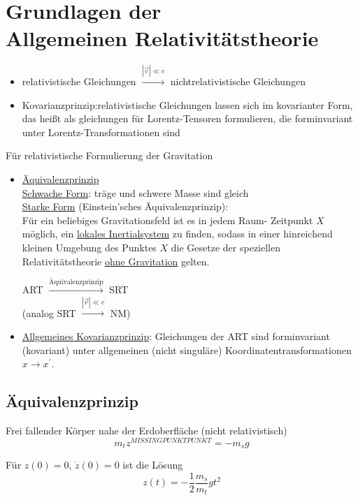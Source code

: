 \documentclass[a4paper, 11pt]{article}
\numberwithin{equation}{section}
\begin{document}
\newpage
\section{Grundlagen der \\Allgemeinen Relativitätstheorie}

\renewcommand{\labelitemi}{$\bullet$}
\begin{itemize}
\item relativistische Gleichungen $\xrightarrow{|\vec{v}| \ll c}$ nichtrelativistische Gleichungen

\item Kovarianzprinzip:relativistische Gleichungen lassen sich im kovarianter Form, das heißt als gleichungen für Lorentz-Tensoren formulieren, die forminvariant unter Lorentz-Transformationen sind
\end{itemize}

Für relativistische Formulierung der Gravitation
\begin{itemize}
\item \underline{Äquivalenzprinzip}\\
\underline{Schwache Form}: träge und schwere Masse sind gleich\\
\underline{Starke Form} (Einstein'sches Äquivalenzprinzip):\\
Für ein beliebiges Gravitationsfeld ist es in jedem Raum- Zeitpunkt $X$ möglich, ein \underline{lokales Inertialsystem} zu finden, sodass in einer hinreichend kleinen Umgebung des Punktes $X$ die Gesetze der speziellen Relativitätstheorie \underline{ohne Gravitation} gelten.

ART $\xrightarrow{\text{Äquivalenzprinzip}}$ SRT\\
(analog SRT $\xrightarrow{|\vec{v}| \ll c}$ NM)
\item \underline{Allgemeines Kovarianzprinzip}: Gleichungen der ART sind forminvariant (kovariant) unter allgemeinen (nicht singuläre) Koordinatentransformationen $x \rightarrow x^\prime$.
\end{itemize}

\subsection*{Äquivalenzprinzip}
Frei fallender Körper nahe der Erdoberfläche (nicht relativistisch)
\begin{equation*}
m_t z^{MISSING PUNKT PUNKT} = -m_s g
\end{equation*}

Für $z(0) = 0$, $\dot{z}(0) = 0 $ ist die Lösung
\begin{equation}
z(t) = - \dfrac{1}{2} \dfrac{m_s}{m_t} g t^2
\end{equation}
\end{document}
